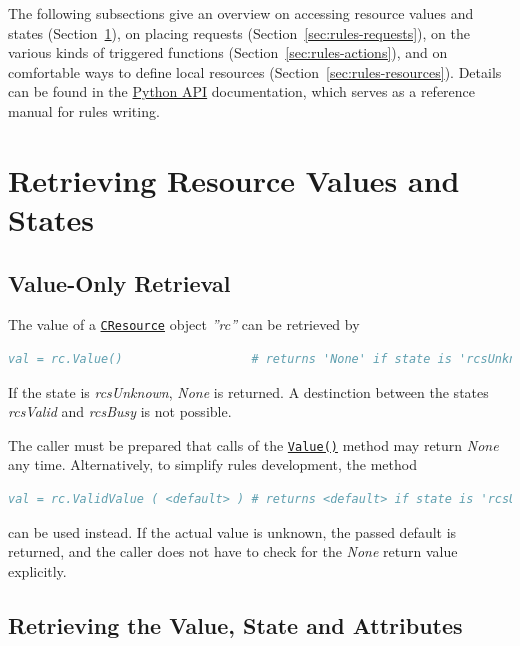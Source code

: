 \documentclass[12pt,english,parskip=half,headheight=19pt]{scrreprt}
\newcommand{\refdoc}[2]{\href{#1}{#2}}              %
\newcommand{\refapipython}[1]{\href{home2l-api_python/index.html}{\mbox{\texttt{#1}}}}  %
\newcommand{\theapipython}{\refdoc{home2l-api_python/index.html}{Python API}}
\begin{document}
The following subsections give an overview on accessing resource values and states (Section~\ref{sec:rules-values}), on placing requests (Section~\ref{sec:rules-requests}), on the various kinds of triggered functions (Section~\ref{sec:rules-actions}), and on comfortable ways to define local resources (Section~\ref{sec:rules-resources}). Details can be found in the \theapipython{} documentation, which serves as a reference manual for rules writing.





\section{Retrieving Resource Values and States}
\label{sec:rules-values}



\subsection{Value-Only Retrieval}

The value of a \refapipython{CResource} object \textit{''rc''} can be retrieved by
\begin{lstlisting}[language=comments]
val = rc.Value()                  # returns 'None' if state is 'rcsUnknown'
\end{lstlisting}

If the state is \textit{rcsUnknown}, \textit{None} is returned. A destinction between the states \textit{rcsValid} and \textit{rcsBusy} is not possible.

The caller must be prepared that calls of the \refapipython{Value()} method may return \textit{None} any time.
Alternatively, to simplify rules development, the method
\begin{lstlisting}[language=comments]
val = rc.ValidValue ( <default> ) # returns <default> if state is 'rcsUnknown'
\end{lstlisting}
can be used instead. If the actual value is unknown, the passed default is returned, and the caller does not have to check for the \textit{None} return value explicitly.



\subsection{Retrieving the Value, State and Attributes}
\end{document}
